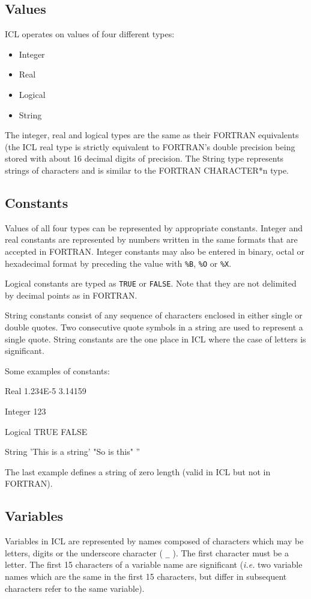 \documentclass[twoside,11pt,nolof,chapters]{starlink}
\begin{document}
\subsection{Values}
ICL operates on values of four different types:
\begin{itemize}
\item Integer
\item Real
\item Logical
\item String
\end{itemize}
The integer, real and logical types are the same as their FORTRAN equivalents
(the ICL real type is strictly equivalent to FORTRAN's double precision being
stored with about 16 decimal digits of precision. The String type represents
strings of characters and is similar to the FORTRAN CHARACTER*n type.
\subsection{Constants}
Values of all four types can be represented by appropriate constants.
Integer and real constants are represented by numbers written in the
same formats that are accepted in FORTRAN. Integer constants may also
be entered in binary, octal or hexadecimal format by preceding the
value with \verb+%B+, \verb+%O+ or \verb+%X+.

Logical constants are typed as \verb+TRUE+ or \verb+FALSE+. Note that they
are not delimited by decimal points as in FORTRAN.

String constants consist of any sequence of characters enclosed in
either single or double quotes. Two consecutive quote symbols in a
string are used to represent a single quote. String constants are the
one place in ICL where the case of letters is significant.

Some examples of constants:

\begin{terminalv}
    Real          1.234E-5       3.14159

    Integer       123      %

    Logical       TRUE     FALSE

    String        'This is a string'     "So is this"      ''
\end{terminalv}

The last example defines a string of zero length (valid in ICL but not in
FORTRAN).
\subsection{Variables}
Variables in ICL are represented by names composed of characters which
may be letters, digits or the underscore character ( \verb+_+ ). The first
character must be a letter. The first 15 characters of a variable name
are significant (\emph{i.e.} two variable names which are the same in the
first 15 characters, but differ in subsequent characters refer to the
same variable).
\end{document}
